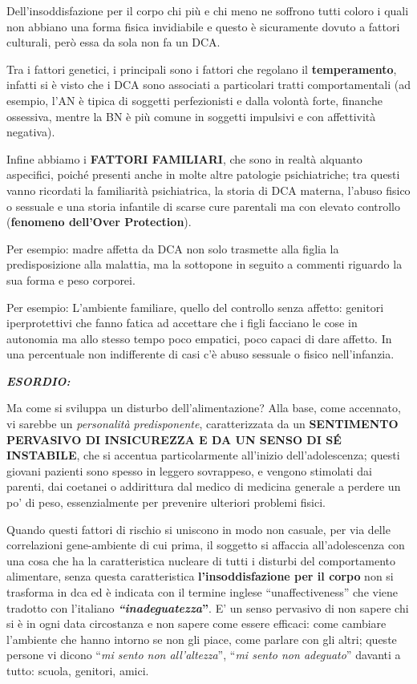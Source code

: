 \documentclass[]{article}
\begin{document}
Dell'insoddisfazione per il corpo chi più e chi meno ne soffrono tutti
coloro i quali non abbiano una forma fisica invidiabile e questo è
sicuramente dovuto a fattori culturali, però essa da sola non fa un DCA.

Tra i fattori genetici, i principali sono i fattori che regolano il
\textbf{temperamento}, infatti si è visto che i DCA sono associati a
particolari tratti comportamentali (ad esempio, l'AN è tipica di
soggetti perfezionisti e dalla volontà forte, finanche ossessiva, mentre
la BN è più comune in soggetti impulsivi e con affettività negativa).

Infine abbiamo i \textbf{FATTORI FAMILIARI}, che sono in realtà alquanto
aspecifici, poiché presenti anche in molte altre patologie
psichiatriche; tra questi vanno ricordati la familiarità psichiatrica,
la storia di DCA materna, l'abuso fisico o sessuale e una storia
infantile di scarse cure parentali ma con elevato controllo
(\textbf{fenomeno dell'Over Protection}).

Per esempio: madre affetta da DCA non solo trasmette alla figlia la
predisposizione alla malattia, ma la sottopone in seguito a commenti
riguardo la sua forma e peso corporei.

Per esempio: L'ambiente familiare, quello del controllo senza affetto:
genitori iperprotettivi che fanno fatica ad accettare che i figli
facciano le cose in autonomia ma allo stesso tempo poco empatici, poco
capaci di dare affetto. In una percentuale non indifferente di casi c'è
abuso sessuale o fisico nell'infanzia.

\textbf{\emph{ESORDIO:}}

Ma come si sviluppa un disturbo dell'alimentazione? Alla base, come
accennato, vi sarebbe un \emph{personalità} \emph{predisponente},
caratterizzata da un \textbf{SENTIMENTO PERVASIVO DI INSICUREZZA E DA UN
SENSO DI SÉ INSTABILE}, che si accentua particolarmente all'inizio
dell'adolescenza; questi giovani pazienti sono spesso in leggero
sovrappeso, e vengono stimolati dai parenti, dai coetanei o addirittura
dal medico di medicina generale a perdere un po' di peso, essenzialmente
per prevenire ulteriori problemi fisici.

Quando questi fattori di rischio si uniscono in modo non casuale, per
via delle correlazioni gene-ambiente di cui prima, il soggetto si
affaccia all'adolescenza con una cosa che ha la caratteristica nucleare
di tutti i disturbi del comportamento alimentare, senza questa
caratteristica \textbf{l'insoddisfazione per il corpo} non si trasforma
in dca ed è indicata con il termine inglese ``unaffectiveness'' che
viene tradotto con l'italiano \textbf{\emph{\emph{``inadeguatezza}}''}.
E' un senso pervasivo di non sapere chi si è in ogni data circostanza e
non sapere come essere efficaci: come cambiare l'ambiente che hanno
intorno se non gli piace, come parlare con gli altri; queste persone vi
dicono ``\emph{mi sento non all'altezza}'', ``\emph{mi sento non
adeguato}'' davanti a tutto: scuola, genitori, amici.
\end{document}
